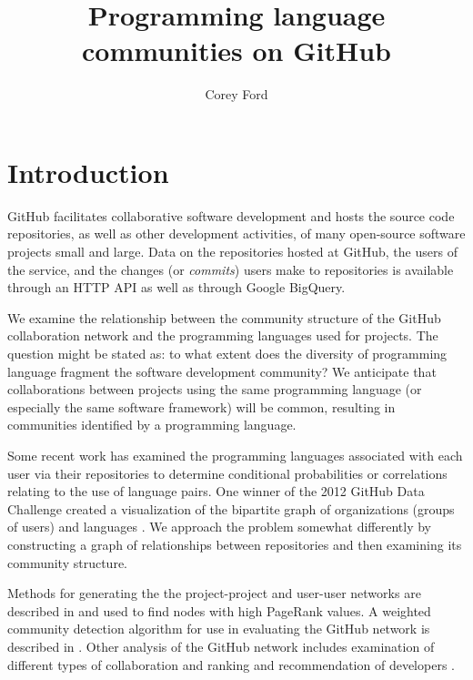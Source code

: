 \documentclass[twocolumn]{article}
\title{Programming language communities on GitHub}
\author{Corey Ford}
\begin{document}
\maketitle

\section*{Introduction}

GitHub \cite{github} facilitates collaborative software development and hosts
the source code repositories, as well as other development activities, of many
open-source software projects small and large. Data on the repositories hosted
at GitHub, the users of the service, and the changes (or \textit{commits}) users
make to repositories is available through an HTTP API as well as through Google
BigQuery.

We examine the relationship between the community structure of the GitHub
collaboration network and the programming languages used for projects. The
question might be stated as: to what extent does the diversity of programming
language fragment the software development community? We anticipate that
collaborations between projects using the same programming language (or
especially the same software framework) will be common, resulting in communities
identified by a programming language.

Some recent work has examined the programming languages associated with each
user via their repositories to determine conditional probabilities \cite{doll12}
or correlations \cite{shah13} relating to the use of language pairs. One winner
of the 2012 GitHub Data Challenge created a visualization of the bipartite graph
of organizations (groups of users) and languages \cite{rodrigues12}. We approach
the problem somewhat differently by constructing a graph of relationships
between repositories and then examining its community structure.

Methods for generating the the project-project and user-user networks are
described in \cite{thung2013} and used to find nodes with high PageRank values.
A weighted community detection algorithm for use in evaluating the GitHub
network is described in \cite{marrama}. Other analysis of the GitHub network
includes examination of different types of collaboration \cite{khadke} and
ranking and recommendation of developers \cite{sarma}.
\end{document}
